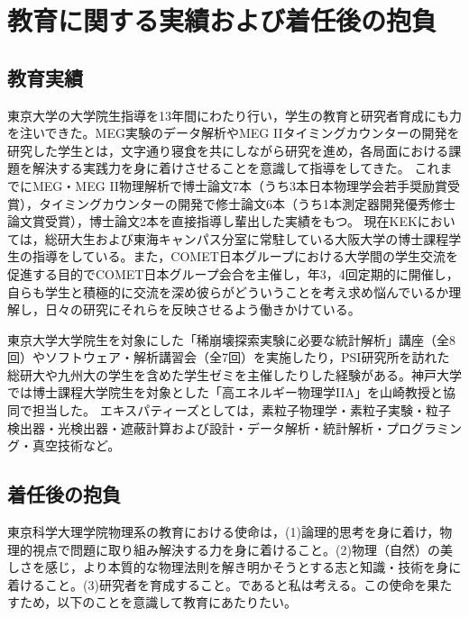 
\section{教育に関する実績および着任後の抱負}

\noindent
\vspace{-2zw}

\subsection{教育実績}
東京大学の大学院生指導を13年間にわたり行い，学生の教育と研究者育成にも力を注いできた。MEG実験のデータ解析やMEG IIタイミングカウンターの開発を研究した学生とは，文字通り寝食を共にしながら研究を進め，各局面における課題を解決する実践力を身に着けさせることを意識して指導をしてきた。%
これまでにMEG・MEG II物理解析で博士論文7本（うち3本日本物理学会若手奨励賞受賞），タイミングカウンターの開発で修士論文6本（うち1本測定器開発優秀修士論文賞受賞），博士論文2本を直接指導し輩出した実績をもつ。
現在KEKにおいては，総研大生および東海キャンパス分室に常駐している大阪大学の博士課程学生の指導をしている。また，COMET日本グループにおける大学間の学生交流を促進する目的でCOMET日本グループ会合を主催し，年3，4回定期的に開催し，自らも学生と積極的に交流を深め彼らがどういうことを考え求め悩んでいるか理解し，日々の研究にそれらを反映させるよう働きかけている。

東京大学大学院生を対象にした「稀崩壊探索実験に必要な統計解析」講座（全8回）やソフトウェア・解析講習会（全7回）を実施したり，PSI研究所を訪れた総研大や九州大の学生を含めた学生ゼミを主催したりした経験がある。神戸大学では博士課程大学院生を対象とした「高エネルギー物理学IIA」を山崎教授と協同で担当した。
エキスパティーズとしては，素粒子物理学・素粒子実験・粒子検出器・光検出器・遮蔽計算および設計・データ解析・統計解析・プログラミング・真空技術など。

\subsection{着任後の抱負}

東京科学大理学院物理系の教育における使命は，(1)論理的思考を身に着け，物理的視点で問題に取り組み解決する力を身に着けること。(2)物理（自然）の美しさを感じ，より本質的な物理法則を解き明かそうとする志と知識・技術を身に着けること。(3)研究者を育成すること。であると私は考える。この使命を果たすため，以下のことを意識して教育にあたりたい。


